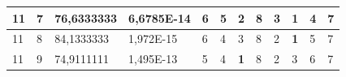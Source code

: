 \documentclass[conference]{IEEEtran}
\begin{document}
\begin{table}[]
\begin{tabular}{|llll|llllllll|}
\multicolumn{1}{|l|}{11}                                                    & \multicolumn{1}{l|}{7}                                                        & \multicolumn{1}{l|}{76,6333333}                                                   & 6,6785E-14                     & \multicolumn{1}{l|}{6}                                                  & \multicolumn{1}{l|}{5}                                                  & \multicolumn{1}{l|}{2}                                                  & \multicolumn{1}{l|}{8}                                                  & \multicolumn{1}{l|}{3}                                                  & \multicolumn{1}{l|}{\textbf{1}}                                         & \multicolumn{1}{l|}{4}                                                  & 7                          \\ \hline
\multicolumn{1}{|l|}{11}                                                    & \multicolumn{1}{l|}{8}                                                        & \multicolumn{1}{l|}{84,1333333}                                                   & 1,972E-15                      & \multicolumn{1}{l|}{6}                                                  & \multicolumn{1}{l|}{4}                                                  & \multicolumn{1}{l|}{3}                                                  & \multicolumn{1}{l|}{8}                                                  & \multicolumn{1}{l|}{2}                                                  & \multicolumn{1}{l|}{\textbf{1}}                                         & \multicolumn{1}{l|}{5}                                                  & 7                          \\ \hline
\multicolumn{1}{|l|}{11}                                                    & \multicolumn{1}{l|}{9}                                                        & \multicolumn{1}{l|}{74,9111111}                                                   & 1,495E-13                      & \multicolumn{1}{l|}{5}                                                  & \multicolumn{1}{l|}{4}                                                  & \multicolumn{1}{l|}{\textbf{1}}                                         & \multicolumn{1}{l|}{8}                                                  & \multicolumn{1}{l|}{2}                                                  & \multicolumn{1}{l|}{3}                                                  & \multicolumn{1}{l|}{6}                                                  & 7                          \\ \hline

\end{tabular}
\end{table}
\end{document}
